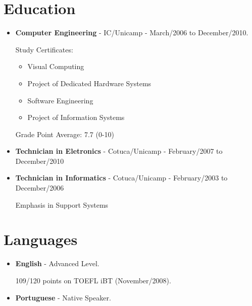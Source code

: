 \documentclass[a4paper,10pt]{article}
\begin{document}
  \section{Education}
    \begin{itemize}
      \item  
        \textbf{Computer Engineering} - IC/Unicamp - March/2006 to December/2010.

        Study Certificates:
        \begin{itemize}
          \item Visual Computing
          \item Project of Dedicated Hardware Systems
          \item Software Engineering
          \item Project of Information Systems
        \end{itemize}

        Grade Point Average: 7.7  (0-10)


      \item  
        \textbf{Technician in Eletronics} - Cotuca/Unicamp - February/2007 to December/2010


      \item  
        \textbf{Technician in Informatics} - Cotuca/Unicamp - February/2003 to December/2006

        Emphasis in Support Systems


    \end{itemize}
    
  \section{Languages}
    \begin{itemize}
      \item  
        \textbf{English} - Advanced Level.

        109/120 points on TOEFL iBT (November/2008).

      \item  
        \textbf{Portuguese} - Native Speaker.
    \end{itemize}
\end{document}
